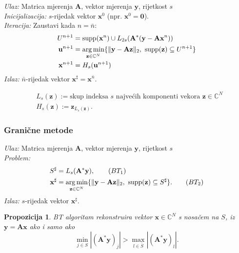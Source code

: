 \documentclass{beamer}
\newtheorem{prop}[thm]{Propozicija}
\newcommand{\C}{\mathbb{C}}
\newcommand{\vect}[1]{\mathbf{#1}}
\renewcommand{\vec}{\vect}
\newcommand{\supp}{\text{\normalfont{supp}}}
\newcommand{\norm}[1]{\|{#1}\|}
\DeclareMathOperator*{\argmin}{arg\,min}
\newenvironment{alg}[1]
{
    \bigskip
    \begin{tcolorbox}[arc=0mm,boxrule=1.2pt,colframe=black,colback=white,detach title, before upper={\medskip\begin{center}\textbf{#1}\end{center}\hline\newline\medskip},frame hidden]
    \medskip
}
{
    \medskip
\end{tcolorbox}
}
\begin{document}
\begin{frame}
    \begin{alg}{CoSaMP (\textit{Compressive sensing matching pursuit})}
    \textit{Ulaz:} Matrica mjerenja $\vec A$, vektor mjerenja $\vec y$, rijetkost $s$ \\
    \textit{Inicijalizacija:} $s$-rijedak vektor $\vec x^0$ (npr. $\vec x^0 = \vec 0$).\\
    \textit{Iteracija:} Zaustavi kada $n = \bar{n}$:
        \begin{align*}
            U^{n+1} & = \supp(\vec x^n)\cup L_{2s}(\vec A^*(\vec y - \vec{Ax}^n))\\
            \vec u^{n+1} & = \argmin_{\vec z \in \C^N}\{\norm{\vec y - \vec{Az}}_2,\ \supp(\vec z) \subseteq U^{n+1}\} \\
            \vec x^{n+1} & = H_s(\vec u^{n+1})
        \end{align*}
        \textit{Izlaz:} $\bar{n}$-rijedak vektor $\vec x^{\sharp}=\vec{x}^{\bar{n}}$.
\end{alg}
\begin{align*}
    &L_s(\vec z) := \text{skup indeksa $s$ najve\'cih komponenti vekora } \vec z \in \C^N \\
    &H_s(\vec z) := \vec z_{L_s(\vec z)}.
\end{align*}
    
\end{frame}

\begin{frame}
    \frametitle{Grani\v{c}ne metode} 
    \begin{alg}{BT (\textit{Basic thresholding})}
    \textit{Ulaz:} Matrica mjerenja $\vec A$, vektor mjerenja $\vec y$, rijetkost $s$ \\
    \textit{Problem:}
        \begin{align*}
            S^{\sharp} &= L_s(\vec A^* \vec y),\tag{$BT_1$}\label{bt_1}\\
            \vec x^{\sharp} &= \argmin_{\vec z \in \C^N}\{\norm{\vec y - \vec{Az}}_2,\ \supp(\vec z) \subseteq S^{\sharp}\}.\tag{$BT_2$}\label{bt_2}\\
        \end{align*}
        \textit{Izlaz:} $s$-rijedak vektor $\vec x^{\sharp}$.
\end{alg}
\end{frame}

\begin{frame}
\begin{prop}\label{prop:3:7}
    BT algoritam rekonstruira vektor $\vec x \in \C^N$ s nosa\v{c}em na $S$, iz $\vec y = \vec{Ax}$ ako i samo ako
    \begin{equation*}
        \min_{j \in S}|(\vec A^* \vec y)_j| > \max_{l \in \bar{S}} |(\vec A^* \vec y)_l| .
    \end{equation*}
\end{prop}
\end{frame}
\end{document}
